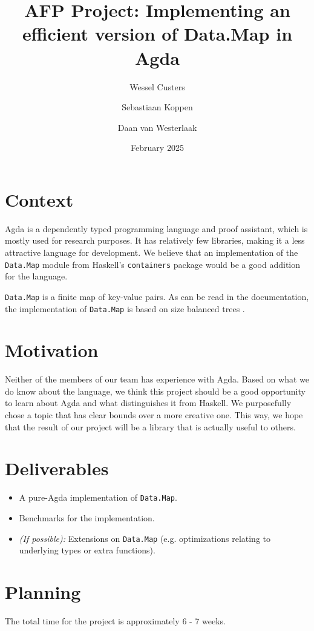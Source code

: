 \documentclass[a4paper,UKenglish,cleveref, autoref, thm-restate]{../template/lipics-v2021}
\title{AFP Project: Implementing an efficient version of Data.Map in Agda}
\author{Wessel Custers}{Utrecht University, Netherlands}{}{}{}
\author{Sebastiaan Koppen}{Utrecht University, Netherlands}{}{}{}
\author{Daan van Westerlaak}{Utrecht University, Netherlands}{}{}{}
\date{February 2025}
\begin{document}
\maketitle

\section{Context}
Agda is a dependently typed programming language and proof assistant, which is mostly used for research purposes. It has relatively few libraries, making it a less attractive language for development. We believe that an implementation of the \texttt{Data.Map} module from Haskell's \texttt{containers} package would be a good addition for the language.

\texttt{Data.Map} is a finite map of key-value pairs. As can be read in the documentation, the implementation of \texttt{Data.Map} is based on size balanced trees \cite{adams1993functional, nievergelt1972binary}.

\section{Motivation}
Neither of the members of our team has experience with Agda. Based on what we do know about the language, we think this project should be a good opportunity to learn about Agda and what distinguishes it from Haskell. We purposefully chose a topic that has clear bounds over a more creative one. This way, we hope that the result of our project will be a library that is actually useful to others.

\section{Deliverables}
\begin{itemize}
    \item A pure-Agda implementation of \texttt{Data.Map}.
    \item Benchmarks for the implementation.
    \item \textit{(If possible):} Extensions on \texttt{Data.Map} (e.g. optimizations relating to underlying types or extra functions).
\end{itemize}

\section{Planning}
The total time for the project is approximately 6 - 7 weeks.
\end{document}
